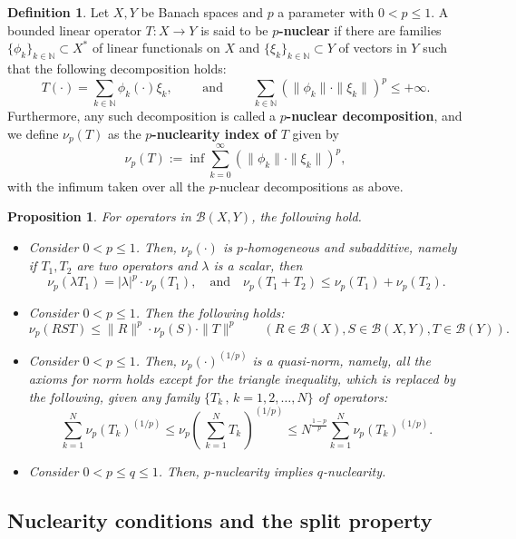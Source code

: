 \documentclass[a4paper,12pt]{article}
\theoremstyle{plain}
\newtheorem{prop}[theo]{Proposition}
\theoremstyle{definition}
\newtheorem{defi}[theo]{Definition}
\theoremstyle{remark}
\def\B{{\mathcal B}}
\begin{document}
\begin{defi}\label{def:pnuc} Let $X,Y$ be Banach spaces and $p$ a parameter with $0<p\le 1$.
  A bounded linear operator $T: X\to Y$ is said to be {\bf $p$-nuclear} if there are families
  $ \{ \phi_k \}_{k\in\mathbb{N}} \subset  X^*$ of linear functionals on $X$ and 
  $ \{ \xi_k  \}_{k\in\mathbb{N}} \subset Y$ of vectors in $Y$ such that the following decomposition holds:
  \[
   T(\cdot) = \sum_{k\in\mathbb{N}} \phi_k(\cdot) \xi_k , \qquad 
   \textrm{ and } \qquad \sum_{k\in\mathbb{N}} \left(\|\phi_k\| \cdot \| \xi_k \|\right)^p \le +\infty.
  \]
  Furthermore, any such decomposition is called a {\bf $p$-nuclear decomposition},
  and we define $\nu_p(T)$ as the {\bf $p$-nuclearity index of $T$} given by
  \[\nu_p(T) := \inf \sum_{k=0}^\infty (\|\phi_k\|\cdot \| \xi_k\|)^p, \]
  with the infimum taken over all the $p$-nuclear decompositions as above.
  \end{defi}

\begin{prop}\label{pro:lpspace} For operators in $\B(X,Y)$, the following hold.
  \begin{itemize}
  \item Consider $0<p\le 1$. Then, $\nu_p(\cdot)$ is $p$-homogeneous and subadditive, namely if $T_1,T_2$ are two operators and $\lambda$ is a scalar, then
    \[\nu_p(\lambda T_1) = |\lambda|^p \cdot \nu_p(T_1), \quad \textrm{and} \quad
    \nu_p(T_1+T_2) \le \nu_p(T_1) + \nu_p(T_2). \]
  \item Consider $0<p\le 1$. Then the following holds:
    \[\nu_p( R S T) \le \|R\|^p \cdot \nu_p(S) \cdot  \|T\|^p \qquad (R\in\B(X),S\in\B(X,Y),T\in\B(Y)). \]
  \item Consider $0<p\le 1$. Then, $\nu_p(\cdot)^{(1/p)}$ is a quasi-norm, namely, all the axioms for norm holds except for the triangle inequality, which is replaced by the following, given any family $\{T_k \, , \, k=1,2,\ldots,N\}$ of operators: \[ \sum_{k=1}^N\nu_p(T_k)^{(1/p)} \le \nu_p\left(\,\sum_{k=1}^N T_k\,\right)^{(1/p)} \le N^{\frac{1-p}{p}}\sum_{k=1}^N\nu_p(T_k)^{(1/p)} .\]
  \item Consider $0<p\le q \le 1$. Then, $p$-nuclearity implies $q$-nuclearity.
  \end{itemize}
\end{prop}

\subsection{Nuclearity conditions and the split property}\label{subsec:nuc}
\end{document}
